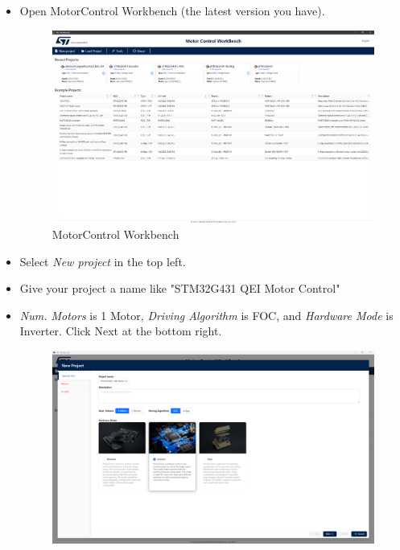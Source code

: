 \documentclass[10pt]{article}
\begin{document}
            \begin{itemize}
                \item Open MotorControl Workbench (the latest version you have). 
                    \begin{figure}[H]
                        \centerline{\includegraphics[width=\textwidth]{References/MC Workbench.png}}
                        \caption{MotorControl Workbench}
                    \end{figure}
                \item Select \emph{New project} in the top left.
                \item Give your project a name like "STM32G431 QEI Motor Control"
                \item \emph{Num. Motors} is 1 Motor, \emph{Driving Algorithm} is FOC, and \emph{Hardware Mode} is Inverter. Click Next at the bottom right.
                    \begin{figure}[H]
                        \centerline{\includegraphics[width=\textwidth]{References/MCW QEI New Project.png}}

\end{figure}
\end{itemize}
\end{document}
